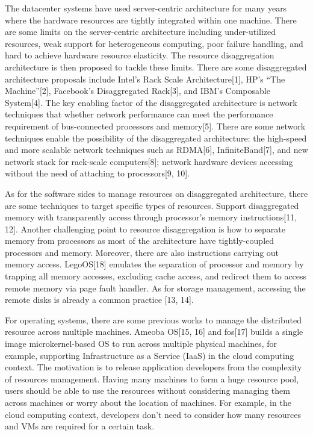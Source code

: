 \documentclass[twocolumn]{article}
\begin{document}
The datacenter systems have used server-centric architecture for many years where the hardware resources are tightly integrated within one machine. There are some limits on the server-centric architecture including under-utilized resources, weak support for heterogeneous computing, poor failure handling, and hard to achieve hardware resource elasticity. The resource disaggregation architecture is then proposed to tackle these limits. There are some disaggregated architecture proposals include Intel’s Rack Scale Architecture[1], HP’s “The Machine”[2], Facebook’s Disaggregated Rack[3], and IBM’s Composable System[4]. The key enabling factor of the disaggregated architecture is network techniques that whether network performance can meet the performance requirement of bus-connected processors and memory[5]. There are some network techniques enable the possibility of the disaggregated architecture: the high-speed and more scalable network techniques such as RDMA[6], InfiniteBand[7], and new network stack for rack-scale computers[8]; network hardware devices accessing without the need of attaching to processors[9, 10]. \par
    As for the software sides to manage resources on disaggregated architecture, there are some techniques to target specific types of resources. Support disaggregated memory with transparently access through processor’s memory instructions[11, 12]. Another challenging point to resource disaggregation is how to separate memory from processors as most of the architecture have tightly-coupled processors and memory. Moreover, there are also instructions carrying out memory access. LegoOS[18] emulates the separation of processor and memory by trapping all memory accesses, excluding cache access, and redirect them to access remote memory via page fault handler. As for storage management, accessing the remote disks is already a common practice [13, 14]. \par
    For operating systems, there are some previous works to manage the distributed resource across multiple machines. Ameoba OS[15, 16] and fos[17] builds a single image microkernel-based OS to run across multiple physical machines, for example, supporting Infrastructure as a Service (IaaS) in the cloud computing context. The motivation is to release application developers from the complexity of resources management. Having many machines to form a huge resource pool, users should be able to use the resources without considering managing them across machines or worry about the location of machines. For example, in the cloud computing context, developers don’t need to consider how many resources and VMs are required for a certain task. \par
\end{document}
